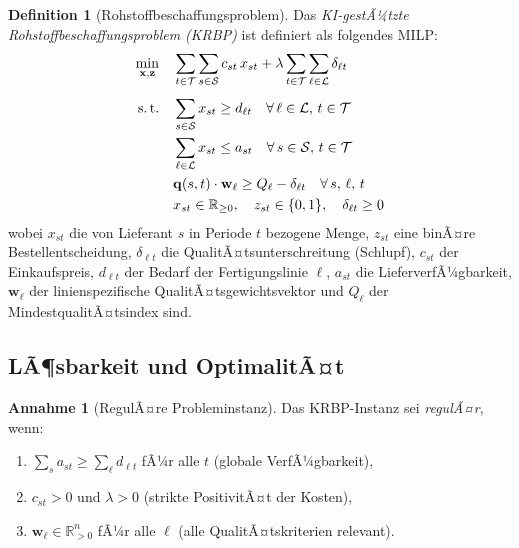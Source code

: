 ﻿\documentclass[12pt,a4paper]{article}
\theoremstyle{plain}
\theoremstyle{definition}
\newtheorem{definition}[theorem]{Definition}
\newtheorem{assumption}[theorem]{Annahme}
\begin{document}
	\begin{definition}[Rohstoffbeschaffungsproblem]
		Das \emph{KI-gestÃ¼tzte Rohstoffbeschaffungsproblem (KRBP)} ist definiert
		als folgendes MILP:
		\begin{align}
			\min_{\mathbf{x}, \mathbf{z}} \quad
			& \sum_{t \in \mathcal{T}} \sum_{s \in \mathcal{S}}
			c_{st}\, x_{st} + \lambda \sum_{t \in \mathcal{T}} \sum_{\ell \in \mathcal{L}}
			\delta_{\ell t}
			\label{eq:milp_obj} \\[4pt]
			\text{s.\,t.} \quad
			& \sum_{s \in \mathcal{S}} x_{st} \geq d_{\ell t}
			\quad \forall\, \ell \in \mathcal{L},\, t \in \mathcal{T}
			\label{eq:demand} \\
			& \sum_{\ell \in \mathcal{L}} x_{st} \leq a_{st}
			\quad \forall\, s \in \mathcal{S},\, t \in \mathcal{T}
			\label{eq:supply} \\
			& \mathbf{q}(s,t) \cdot \mathbf{w}_\ell \geq Q_\ell - \delta_{\ell t}
			\quad \forall\, s,\, \ell,\, t
			\label{eq:quality} \\
			& x_{st} \in \mathbb{R}_{\geq 0}, \quad
			z_{st} \in \{0, 1\}, \quad
			\delta_{\ell t} \geq 0
			\label{eq:domains}
		\end{align}
		wobei $x_{st}$ die von Lieferant $s$ in Periode $t$ bezogene Menge,
		$z_{st}$ eine binÃ¤re Bestellentscheidung, $\delta_{\ell t}$ die
		QualitÃ¤tsunterschreitung (Schlupf), $c_{st}$ der Einkaufspreis,
		$d_{\ell t}$ der Bedarf der Fertigungslinie $\ell$, $a_{st}$ die
		LieferverfÃ¼gbarkeit, $\mathbf{w}_\ell$ der linienspezifische
		QualitÃ¤tsgewichtsvektor und $Q_\ell$ der MindestqualitÃ¤tsindex sind.
	\end{definition}
	
	\subsection{LÃ¶sbarkeit und OptimalitÃ¤t}
	
	\begin{assumption}[RegulÃ¤re Probleminstanz]
		\label{ass:regular}
		Das KRBP-Instanz sei \emph{regulÃ¤r}, wenn:
		\begin{enumerate}[label=(\roman*)]
			\item $\sum_{s} a_{st} \geq \sum_\ell d_{\ell t}$ fÃ¼r alle $t$
			(globale VerfÃ¼gbarkeit),
			\item $c_{st} > 0$ und $\lambda > 0$ (strikte PositivitÃ¤t der Kosten),
			\item $\mathbf{w}_\ell \in \mathbb{R}_{>0}^n$ fÃ¼r alle $\ell$
			(alle QualitÃ¤tskriterien relevant).
		\end{enumerate}
	\end{assumption}
	
\end{document}
